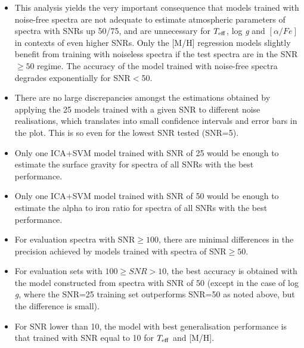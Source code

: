 \documentclass[a4paper,fleqn,usenatbib]{mnras}
\begin{document}
{{{\begin{itemize}
\item This analysis yields the very important consequence that models
  trained with noise-free spectra are not adequate to estimate
  atmospheric parameters of spectra with SNRs up 50/75, and are
  unnecessary for $T_{\rm eff}$, log \textit{g} and $\left[ \alpha/Fe 
  \right]$ in contexts of even higher SNRs. Only the [M/H] regression 
  models slightly benefit from training with noiseless spectra if the test 
  spectra are in the SNR$\ge 50$ regime. The accuracy of the model 
  trained with noise-free spectra degrades exponentially for SNR$<$50.
\item There are no large discrepancies amongst the estimations
  obtained by applying the 25 models trained with a given SNR to
  different noise realisations, which translates into small confidence
  intervals and error bars in the plot. This is so even for the lowest
  SNR tested (SNR=5).
\item Only one ICA+SVM model trained with SNR of 25 would be enough to
  estimate the surface gravity for spectra of all SNRs with the best
  performance.
\item Only one ICA+SVM model trained with SNR of 50 would be enough to
  estimate the alpha to iron ratio for spectra of all SNRs with 
  the best performance.
\item For evaluation spectra with SNR$\ge 100$, there are minimal
  differences in the precision achieved by models trained with spectra
  of SNR$\ge 50$.  
\item For evaluation sets with $100\ge SNR > 10$, the best accuracy is
  obtained with the model constructed from spectra with SNR of 50
  (except in the case of log {\it g}, where the SNR=25 training set
  outperforms SNR=50 as noted above, but the difference is small).
\item For SNR lower than 10, the model with best generalisation
  performance is that trained with SNR equal to 10 for $T_{\rm eff}$ 
  and [M/H]. 
\end{itemize}

}}}
\end{document}
